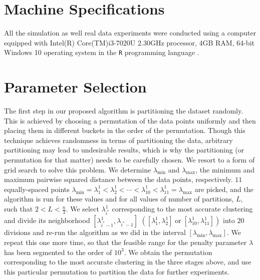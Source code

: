 \documentclass[12pt]{article}
\begin{document}
\section{Machine Specifications}

All the simulation as well real data experiments were conducted using a computer equipped with Intel(R) Core(TM)i3-7020U 2.30GHz  processor, 4GB RAM, 64-bit Windows 10 operating  system in the \texttt{R} programming language \cite{R-lang}.


\section{Parameter Selection}
The first step in our proposed algorithm is partitioning the dataset randomly. This is achieved by choosing a permutation of the data points uniformly and then placing them in different buckets in the order of the permutation. Though this technique achieves randomness in terms of partitioning the data, arbitrary partitioning may lead to undesirable results, which is why the partitioning (or permutation for that matter) needs to be carefully chosen. We resort to a form of grid search to solve this problem. We determine $\lambda_{\min}$ and $\lambda_{\max}$, the minimum and maximum pairwise squared distance between the data points, respectively. $11$ equally-spaced points $\lambda_{\min} =\lambda^1_1<\lambda^1_2< \cdots < \lambda^1_{10}<\lambda^1_{11}=\lambda_{\max}$ are picked, and the algorithm is run for these values and for all values of number of partitions, $L$, such that $2<L<\frac{n}{3}$. We select $\lambda^1_{i^*}$ corresponding to the most accurate clustering and divide its neighborhood $[\lambda^1_{i^*-1},\lambda_{i^*-1}]$  $\left([\lambda^1_1,\lambda^1_2]\operatorname{ or }[\lambda^1_{10}, \lambda^1_{11}]\right)$ into $20$ divisions and re-run the algorithm as we did in the interval $[\lambda_{\min}, \lambda_{\max}]$. We repeat this one more time, so that the feasible range for the penalty parameter $\lambda$ has been segmented to the order of $10^3$. We obtain the permutation corresponding to the most accurate clustering in the three stages above, and use this particular permutation to partition the data for further experiments.
\end{document}
